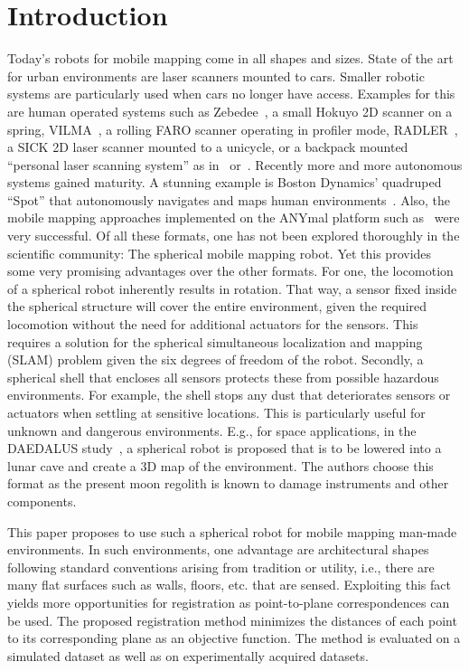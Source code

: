 \section{Introduction}

Today's robots for mobile mapping come in all shapes and sizes.
State of the art for urban environments are laser scanners mounted to cars.
Smaller robotic systems are particularly used when cars no longer have access.
Examples for this are human operated systems such as Zebedee~\cite{Bosse2012-zebedee}, a small Hokuyo 2D scanner on a spring, VILMA~\cite{JPRS2016}, a rolling FARO scanner operating in profiler mode, RADLER~\cite{Borrmann2020-RADLER}, a SICK 2D laser scanner mounted to a unicycle, or a backpack mounted ``personal laser scanning system'' as in~\cite{LauterbackEtAl2015-Backpack} or~\cite{WWWLeicaBackpack}.
Recently more and more autonomous systems gained maturity.
A stunning example is Boston Dynamics' quadruped ``Spot'' that autonomously navigates and maps human environments~\cite{SpotRobot}.
Also, the mobile mapping approaches implemented on the ANYmal platform such as~\cite{Fankhauser2018-ANYmal} were very successful.
Of all these formats, one has not been explored thoroughly in the scientific community: The spherical mobile mapping robot.
Yet this provides some very promising advantages over the other formats.
For one, the locomotion of a spherical robot inherently results in rotation.
That way, a sensor fixed inside the spherical structure will cover the entire environment, given the required locomotion without the need for additional actuators for the sensors.
This requires a solution for the spherical simultaneous localization and mapping (SLAM) problem given the six degrees of freedom of the robot.
Secondly, a spherical shell that encloses all sensors protects these from possible hazardous environments.
For example, the shell stops any dust that deteriorates sensors or actuators when settling at sensitive locations.
This is particularly useful for unknown and dangerous environments.
E.g., for space applications, in the DAEDALUS study~\cite{RossiMaurelliUnnithanetal.2021}, a spherical robot is proposed that is to be lowered into a lunar cave and create a 3D map of the environment. The authors choose this format as the present moon regolith is known to damage instruments and other components.

This paper proposes to use such a spherical robot for mobile mapping man-made environments.
In such environments, one advantage are architectural shapes following standard conventions arising from tradition or utility, i.e., there are many flat surfaces such as walls, floors, etc. that are sensed.
Exploiting this fact yields more opportunities for registration as point-to-plane correspondences can be used.
The proposed registration method minimizes the distances of each point to its corresponding plane as an objective function.
The method is evaluated on a simulated dataset as well as on experimentally acquired datasets.
